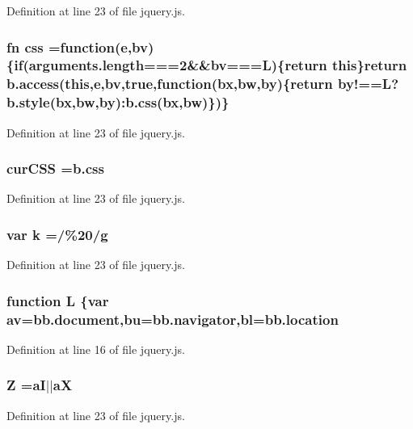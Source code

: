 Definition at line 23 of file jquery.\+js.

\hypertarget{a00039_a89ad527fcd82c01ebb587332f5b4fcd4}{}
\subsubsection[{css}]{ fn css =function(e,bv)\{{\bf if}(arguments.\+length===2\&\&bv==={\bf L})\{return this\}return b.\+access(this,e,bv,true,function(bx,bw,by)\{return by!=={\bf L}?b.\+style(bx,bw,by)\+:b.\+css(bx,bw)\})\}}\label{a00039_a89ad527fcd82c01ebb587332f5b4fcd4}


Definition at line 23 of file jquery.\+js.

\hypertarget{a00039_a88b21f8ba3af86d6981b1da520ece33b}{}
\subsubsection[{cur\+C\+S\+S}]{ cur\+C\+S\+S ={\bf b.\+css}}\label{a00039_a88b21f8ba3af86d6981b1da520ece33b}


Definition at line 23 of file jquery.\+js.

\hypertarget{a00039_ab26645c014aa005ecedef329ecf58c99}{}
\subsubsection[{k}]{\setlength{\rightskip}{0pt plus 5cm}var k =/\%20/g}\label{a00039_ab26645c014aa005ecedef329ecf58c99}


Definition at line 23 of file jquery.\+js.

\hypertarget{a00039_a38ee4c0b5f4fe2a18d0c783af540d253}{}
\subsubsection[{L}]{\setlength{\rightskip}{0pt plus 5cm}function L \{var av=bb.\+document,bu=bb.\+navigator,bl=bb.\+location}\label{a00039_a38ee4c0b5f4fe2a18d0c783af540d253}


Definition at line 16 of file jquery.\+js.

\hypertarget{a00039_adc18d83abfd9f87d396e8fd6b6ac0fe1}{}
\subsubsection[{Z}]{\setlength{\rightskip}{0pt plus 5cm}Z =a\+I$\vert$$\vert$a\+X}\label{a00039_adc18d83abfd9f87d396e8fd6b6ac0fe1}


Definition at line 23 of file jquery.\+js.

